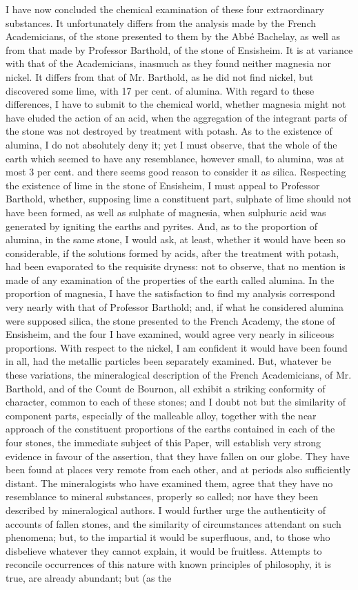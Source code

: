 \documentclass[a4paper, 12pt, oneside, twocolumn]{article}
\begin{document}
I have now concluded the chemical examination of these four extraordinary substances. It unfortunately differs from the analysis made by the French Academicians, of the stone presented to them by the Abbé Bachelay, as well as from that made by Professor Barthold, of the stone of Ensisheim. It is at variance with that of the Academicians, inasmuch as they found neither magnesia nor nickel. It differs from that of Mr. Barthold, as he did not find nickel, but discovered some lime, with 17 per cent. of alumina. With regard to these differences, I have to submit to the chemical world, whether magnesia might not have eluded the action of an acid, when the aggregation of the integrant parts of the stone was not destroyed by treatment with potash. As to the existence of alumina, I do not absolutely deny it; yet I must observe, that the whole of the earth which seemed to have any resemblance, however small, to alumina, was at most 3 per cent. and there seems good reason to consider it as silica. Respecting the existence of lime in the stone of Ensisheim, I must appeal to Professor Barthold, whether, supposing lime a constituent part, sulphate of lime should not have been formed, as well as sulphate of magnesia, when sulphuric acid was generated by igniting the earths and pyrites. And, as to the proportion of alumina, in the same stone, I would ask, at least, whether it would have been so considerable, if the solutions formed by acids, after the treatment with potash, had been evaporated to the requisite dryness: not to observe, that no mention is made of any examination of the properties of the earth called alumina. In the proportion of magnesia, I have the satisfaction to find my analysis correspond very nearly with that of Professor Barthold; and, if what he considered alumina were supposed silica, the stone presented to the French Academy, the stone of Ensisheim, and the four I have examined, would agree very nearly in siliceous proportions. With respect to the nickel, I am confident it would have been found in all, had the metallic particles been separately examined. But, whatever be these variations, the mineralogical description of the French Academicians, of Mr. Barthold, and of the Count de Bournon, all exhibit a striking conformity of character, common to each of these stones; and I doubt not but the similarity of component parts, especially of the malleable alloy, together with the near approach of the constituent proportions of the earths contained in each of the four stones, the immediate subject of this Paper, will establish very strong evidence in favour of the assertion, that they have fallen on our globe. They have been found at places very remote from each other, and at periods also sufficiently distant. The mineralogists who have examined them, agree that they have no resemblance to mineral substances, properly so called; nor have they been described by mineralogical authors. I would further urge the authenticity of accounts of fallen stones, and the similarity of circumstances attendant on such phenomena; but, to the impartial it would be superfluous, and, to those who disbelieve whatever they cannot explain, it would be fruitless. Attempts to reconcile occurrences of this nature with known principles of philosophy, it is true, are already abundant; but (as the 
\end{document}
